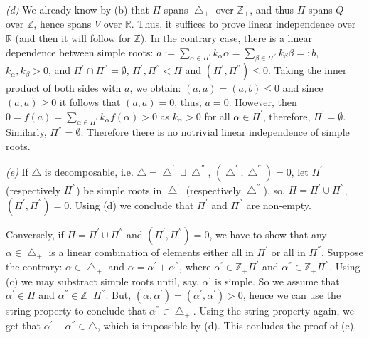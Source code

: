 \documentclass[11pt]{article}
\begin{document}
\textit{(d)} We already know by (b) that $\Pi$ spans $\bigtriangleup_{+}$ over $\mathbb{Z}_{+}$, and thus $\Pi$ spans  $Q$ over $\mathbb{Z}$, hence spans $V$ over $\mathbb{R}$. Thus, it suffices to prove linear independence over $\mathbb{R}$ (and then it will follow for $\mathbb{Z}$). In the contrary case, there is a linear dependence between simple roots: $a:=\sum_{\alpha \in \Pi^{'}} k_{\alpha} \alpha=\sum_{\beta \in \Pi^{''}} k_{\beta} \beta=:b$, $k_\alpha, k_\beta>0$, and $\Pi^{'} \cap \Pi^{''}= \emptyset$, $\Pi^{'}, \Pi^{''}< \Pi$ and $(\Pi^{'}, \Pi^{''})\leq 0$. Taking the inner product of both sides with $a$, we obtain: $(a, a)=(a, b)\leq 0$ and since $(a, a)\geq 0$ it follows that $(a, a)=0$, thus, $a=0$. However, then $0=f(a)=\sum_{\alpha \in \Pi^{'}} k_{\alpha} f(\alpha)>0$ as $k_\alpha>0$ for all $\alpha \in \Pi^{'}$, therefore, $\Pi^{'}=\emptyset$. Similarly, $\Pi^{''}=\emptyset$. Therefore there is no notrivial linear independence of simple roots. 



\textit{(e)} If $\bigtriangleup$ is decomposable, i.e. $\bigtriangleup=\bigtriangleup^{'} \sqcup \bigtriangleup^{''}$, $(\bigtriangleup^{'}, \bigtriangleup^{''})=0$, let $\Pi^{'}$ (respectively $\Pi^{''}$) be simple roots in $\bigtriangleup^{'}$ (respectively $\bigtriangleup^{''}$), so, $\Pi=\Pi^{'}\cup \Pi^{''}$, $(\Pi^{'}, \Pi^{''})=0$. Using (d) we conclude that $\Pi^{'}$ and $\Pi^{''}$ are non-empty. 

Conversely, if  $\Pi=\Pi^{'}\cup \Pi^{''}$ and $(\Pi^{'}, \Pi^{''})=0$, we have to show that any $\alpha \in \bigtriangleup_{+}$ is a linear combination of elements either all in $\Pi^{'}$ or all in $\Pi^{''}$. Suppose the contrary: $\alpha \in \bigtriangleup_{+}$ and $\alpha=\alpha^{'}+\alpha^{''}$, where $\alpha^{'}\in \mathbb{Z}_{+} \Pi^{'}$ and  $\alpha^{''}\in \mathbb{Z}_{+} \Pi^{''}$. Using (c) we may substract simple roots until, say, $\alpha^{'}$ is simple. So we assume that $\alpha^{'} \in \Pi$ and  $\alpha^{''}\in \mathbb{Z}_{+} \Pi^{''}$. But, 
$(\alpha, \alpha^{'})=(\alpha^{'}, \alpha^{'})>0$, hence we can use the string property to conclude that $\alpha^{''}\in   \bigtriangleup_{+}$. Using the string property again, we get that $\alpha^{'}-\alpha^{''} \in  \bigtriangleup$, which is impossible by (d). This conludes the proof of (e).
  
\end{document}
